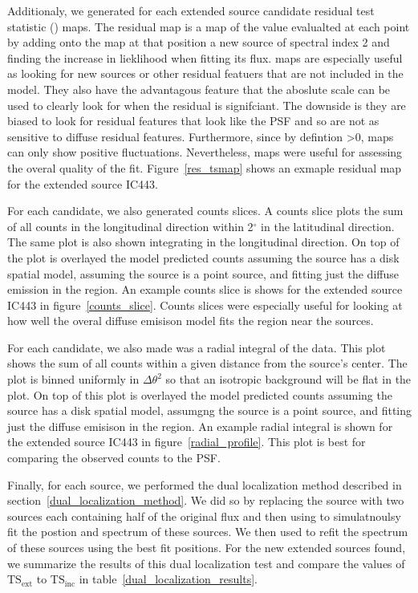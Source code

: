 \documentclass[preprint]{aastex}
\newcommand{\tsext}{{\ensuremath{\text{TS}_\text{ext}}}\xspace}
\newcommand{\tsinc}{\ensuremath{\text{TS}_\text{inc}}\xspace}
\newcommand{\ts}{\text{TS}\xspace}
\renewcommand{\deg}{\ensuremath{^\circ}\xspace}
\newcommand{\pointlike}{\text{\em pointlike}\xspace}
\newcommand{\gtlike}{\text{\em gtlike}\xspace}
\begin{document}
Additionaly, we generated for each extended source candidate residual
test statistic (\ts) maps.  The residual \ts map is a map of the \ts
value evalualted at each point by adding onto the map at that position
a new source of spectral index 2 and finding the increase in lieklihood
when fitting its flux. \ts maps are especially useful as looking for
new sources or other residual featuers that are not included in the
model. They also have the advantagous feature that the aboslute scale
can be used to clearly look for when the residual is signifciant.
The downside is they are biased to look for residual features
that look like the PSF and so are not as sensitive to diffuse residual
features. Furthermore, since by defintion \ts>0, \ts maps can only show
positive fluctuations. Nevertheless, \ts maps were useful for
assessing the overal quality of the fit. Figure~\ref{res_tsmap}
shows an exmaple residual \ts map for the extended source IC443.


For each candidate, we also generated counts slices. A counts slice
plots the sum of all counts in the longitudinal direction within 2\deg in
the latitudinal direction.  The same plot is also shown integrating in
the longitudinal direction.  On top of the plot is overlayed the model
predicted counts assuming the source has a disk spatial model, assuming
the source is a point source, and fitting just the diffuse emission in
the region.  An example counts slice is shows for the extended source
IC443 in figure~\ref{counts_slice}. Counts slices were especially useful
for looking at how well the overal diffuse emisison model fits the region
near the sources.

For each candidate, we also made was a radial integral of the data. This
plot shows the sum of all counts within a given distance from the
source's center. The plot is binned uniformly in $\Delta \theta^2$ so
that an isotropic background will be flat in the plot. On top of this
plot is overlayed the model predicted counts assuming the source has a
disk spatial model, assumgng the source is a point source, and fitting
just the diffuse emisison in the region. An example radial integral
is shown for the extended source IC443 in figure~\ref{radial_profile}.
This plot is best for comparing the observed counts to the PSF.

Finally, for each source, we performed the dual localization method
described in section~\ref{dual_localization_method}.  We 
did so by replacing the source with two sources each containing
half of the original flux and then using \pointlike to
simulatnoulsy fit the postion and spectrum of these sources.
We then used \gtlike to refit the spectrum of these
sources using the best fit positions. For the
new extended sources found, we summarize the results of
this dual localization test and compare the values of \tsext
to \tsinc in table~\ref{dual_localization_results}.
\end{document}
